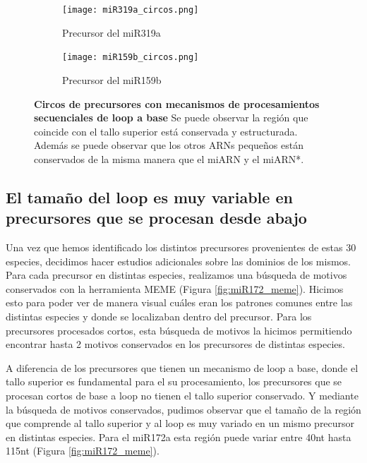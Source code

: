 \begin{landscape}
	\begin{figure}
	\centering
	\begin{subfigure}{.75\textwidth}
 \centering
 \texttt{[image: miR319a\_circos.png]}
 \caption{Precursor del miR319a}
 \label{subfig:miR319a_circos}
	\end{subfigure}%
	\begin{subfigure}{.75\textwidth}
 \centering
 \texttt{[image: miR159b\_circos.png]}
 \caption{Precursor del miR159b}
 \label{subfig:miR159b_circos}
	\end{subfigure}
	\caption[Circos de precursores con mecanismos de procesamientos secuenciales de loop a base]{
			\textbf{Circos de precursores con mecanismos de procesamientos secuenciales de loop a base}
            Se puede observar la región que coincide con el tallo superior está conservada y estructurada.
            Además se puede observar que los otros ARNs pequeños están conservados de la misma manera que el miARN y el miARN*.
   }
	\label{fig:seqLTB_circos}
	\end{figure}
\end{landscape}


\subsection{El tamaño del loop es muy variable en precursores que se procesan desde abajo}

Una vez que hemos identificado los distintos precursores provenientes de estas 30 especies, decidimos hacer estudios adicionales sobre las dominios de los mismos.
Para cada precursor en distintas especies, realizamos una búsqueda de motivos conservados con la herramienta MEME \citep{pmid22115189} (Figura \ref{fig:miR172_meme}).
Hicimos esto para poder ver de manera visual cuáles eran los patrones comunes entre las distintas especies y donde se localizaban dentro del precursor.
Para los precursores procesados cortos, esta búsqueda de motivos la hicimos permitiendo encontrar hasta 2 motivos conservados en los precursores de distintas especies.

A diferencia de los precursores que tienen un mecanismo de loop a base, donde el tallo superior es fundamental para el su procesamiento, los precursores que se procesan cortos de base a loop no tienen el tallo superior conservado.
Y mediante la búsqueda de motivos conservados, pudimos observar que el tamaño de la región que comprende al tallo superior y al loop es muy variado en un mismo precursor en distintas especies.
Para el miR172a esta región puede variar entre 40nt hasta 115nt (Figura \ref{fig:miR172_meme}).

